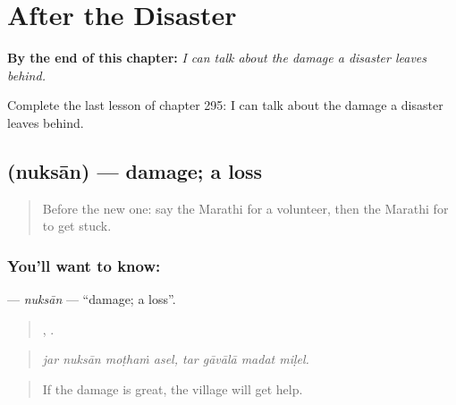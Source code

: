 
\chapter{After the Disaster}
\label{ch:mr-after-the-disaster}

\begin{chapteropening}
\textbf{By the end of this chapter:} \emph{I can talk about the damage a disaster leaves behind.}

Complete the last lesson of chapter 295: I can talk about the damage a disaster leaves behind.
\end{chapteropening}

\section[\texorpdfstring{\mr{नुकसान} (nuksān)}{नुकसान (nuksān)}]{ (nuksān) — damage; a loss}

\label{lesson:MR-C295-nuksan}



\begin{quote}
Before the new one: say the Marathi for a volunteer, then the Marathi for to get stuck.
\end{quote}

\subsection*{You'll want to know: }
\textbf{} — \emph{nuksān} — \textquotedblleft{}damage; a loss\textquotedblright{}.

\begin{quote}
   ,    .
\end{quote}

\begin{quote}
\emph{jar nuksān moṭhaṁ asel, tar gāvālā madat miḷel.}
\end{quote}

\begin{quote}
If the damage is great, the village will get help.
\end{quote}

